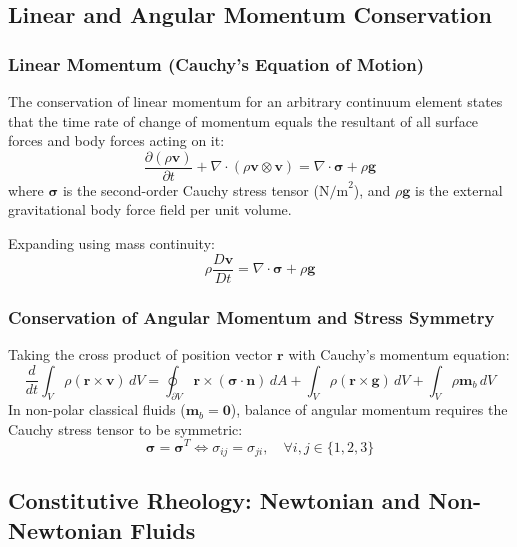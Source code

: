 \documentclass[11pt,a4paper]{article}
\begin{document}
\subsection{Linear and Angular Momentum Conservation}

\subsubsection{Linear Momentum (Cauchy's Equation of Motion)}
The conservation of linear momentum for an arbitrary continuum element states that the time rate of change of momentum equals the resultant of all surface forces and body forces acting on it:
\begin{equation}
\frac{\partial (\rho \mathbf{v})}{\partial t} + \nabla \cdot (\rho \mathbf{v} \otimes \mathbf{v}) = \nabla \cdot \boldsymbol{\sigma} + \rho \mathbf{g}
\end{equation}
where $\boldsymbol{\sigma}$ is the second-order Cauchy stress tensor ($\text{N/m}^2$), and $\rho \mathbf{g}$ is the external gravitational body force field per unit volume.

Expanding using mass continuity:
\begin{equation}
\rho \frac{D\mathbf{v}}{Dt} = \nabla \cdot \boldsymbol{\sigma} + \rho \mathbf{g}
\end{equation}

\subsubsection{Conservation of Angular Momentum and Stress Symmetry}
Taking the cross product of position vector $\mathbf{r}$ with Cauchy's momentum equation:
\begin{equation}
\frac{d}{dt} \int_V \rho (\mathbf{r} \times \mathbf{v}) \, dV = \oint_{\partial V} \mathbf{r} \times (\boldsymbol{\sigma} \cdot \mathbf{n}) \, dA + \int_V \rho (\mathbf{r} \times \mathbf{g}) \, dV + \int_V \rho \mathbf{m}_b \, dV
\end{equation}
In non-polar classical fluids ($\mathbf{m}_b = \mathbf{0}$), balance of angular momentum requires the Cauchy stress tensor to be symmetric:
\begin{equation}
\boldsymbol{\sigma} = \boldsymbol{\sigma}^T \iff \sigma_{ij} = \sigma_{ji}, \quad \forall i, j \in \{1, 2, 3\}
\end{equation}

\subsection{Constitutive Rheology: Newtonian and Non-Newtonian Fluids}
\end{document}
